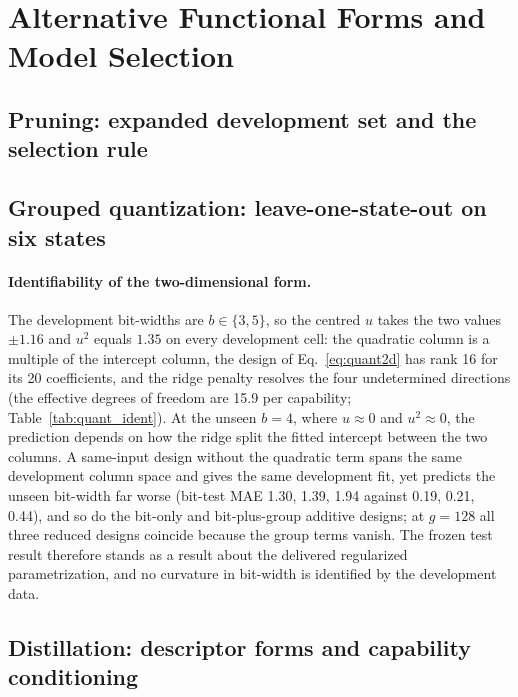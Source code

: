 \section{Alternative Functional Forms and Model Selection}
\label{sec:app_forms}
\subsection{Pruning: expanded development set and the selection rule}

\FloatBarrier
\subsection{Grouped quantization: leave-one-state-out on six states}


\paragraph{Identifiability of the two-dimensional form.} The
development bit-widths are $b\in\{3,5\}$, so the centred $u$ takes the
two values $\pm1.16$ and $u^2$ equals $1.35$ on every development
cell: the quadratic column is a multiple of the intercept column, the
design of Eq.~\eqref{eq:quant2d} has rank 16 for its 20 coefficients,
and the ridge penalty resolves the four undetermined directions (the
effective degrees of freedom are 15.9 per capability;
Table~\ref{tab:quant_ident}). At the unseen $b=4$, where $u\approx0$
and $u^2\approx0$, the prediction depends on how the ridge split the
fitted intercept between the two columns. A same-input design without
the quadratic term spans the same development column space and gives
the same development fit, yet predicts the unseen bit-width far worse
(bit-test MAE 1.30, 1.39, 1.94 against 0.19, 0.21, 0.44), and so do
the bit-only and bit-plus-group additive designs; at $g=128$ all three
reduced designs coincide because the group terms vanish. The frozen
test result therefore stands as a result about the delivered
regularized parametrization, and no curvature in bit-width is
identified by the development data.

\FloatBarrier
\subsection{Distillation: descriptor forms and capability conditioning}


